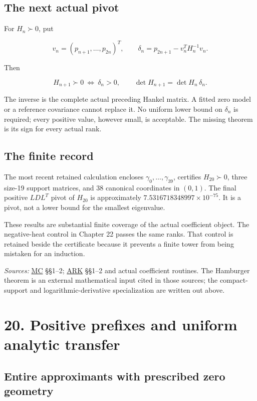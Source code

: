\documentclass[
  10pt,
  a4paper,
  10pt,
  oneside,
  openany]{book}
\begin{document}
\subsection{The next actual pivot}\label{the-next-actual-pivot}

For \(H_n\succ0\), put

\[
v_n=(p_{n+1},\ldots,p_{2n})^T,
\qquad
\delta_n=p_{2n+1}-v_n^TH_n^{-1}v_n.
\tag{19.10}\label{eq:19.10}
\]

Then

\[
H_{n+1}\succ0\ \Longleftrightarrow\ \delta_n>0,
\qquad\det H_{n+1}=\det H_n\,\delta_n.
\tag{19.11}\label{eq:19.11}
\]

The inverse is the complete actual preceding Hankel matrix. A fitted
zero model or a reference covariance cannot replace it. No uniform lower
bound on \(\delta_n\) is required; every positive value, however small,
is acceptable. The missing theorem is its sign for every actual rank.

\subsection{The finite record}\label{the-finite-record}

The most recent retained calculation encloses
\(\gamma_0,\ldots,\gamma_{39}\), certifies \(H_{20}\succ0\), three
size-19 support matrices, and 38 canonical coordinates in \((0,1)\). The
final positive \(LDL^T\) pivot of \(H_{20}\) is approximately
\(7.5316718348997\times10^{-75}\). It is a pivot, not a lower bound for
the smallest eigenvalue.

These results are substantial finite coverage of the actual coefficient
object. The negative-heat control in Chapter 22 passes the same ranks.
That control is retained beside the certificate because it prevents a
finite tower from being mistaken for an induction.

\emph{Sources:} \hyperref[source-mc]{MC} §§1--2;
\hyperref[source-ark]{ARK} §§1--2 and actual coefficient routines. The
Hamburger theorem is an external mathematical input cited in those
sources; the compact-support and logarithmic-derivative specialization
are written out above.

\section{20. Positive prefixes and uniform analytic
transfer}\label{ch-prefix}

\subsection{Entire approximants with prescribed zero
geometry}\label{entire-approximants-with-prescribed-zero-geometry}
\end{document}
